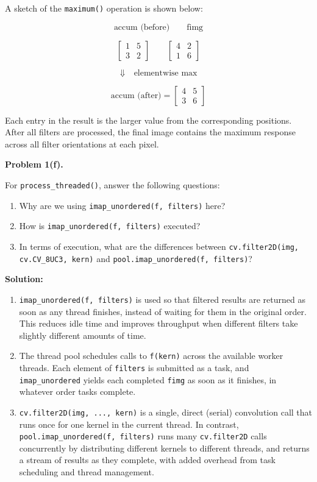 \documentclass[11pt]{article}
\begin{document}
	A sketch of the \texttt{maximum()} operation is shown below:
	
	\[
	\text{accum (before)} \qquad
	\text{fimg}
	\]
	
	\[
	\begin{bmatrix}
		1 & 5 \\
		3 & 2
	\end{bmatrix}
	\qquad
	\begin{bmatrix}
		4 & 2 \\
		1 & 6
	\end{bmatrix}
	\]
	
	\[
	\Downarrow \quad \text{elementwise max}
	\]
	
	\[
	\text{accum (after)} =
	\begin{bmatrix}
		4 & 5 \\
		3 & 6
	\end{bmatrix}
	\]
	
	Each entry in the result is the larger value from the corresponding positions. After all filters are processed, the final image contains the maximum response across all filter orientations at each pixel.
	\newpage
	
	\textbf{Problem 1(f).}
	
	For \texttt{process\_threaded()}, answer the following questions:
	
	\begin{enumerate}
		\item[i.] Why are we using \texttt{imap\_unordered(f, filters)} here?
		\item[ii.] How is \texttt{imap\_unordered(f, filters)} executed?
		\item[iii.] In terms of execution, what are the differences between \texttt{cv.filter2D(img, cv.CV\_8UC3, kern)} and \texttt{pool.imap\_unordered(f, filters)}?
	\end{enumerate}
	
	\textbf{Solution:}
	\begin{enumerate}
		\item[i.] \texttt{imap\_unordered(f, filters)} is used so that filtered results are returned as soon as any thread finishes, instead of waiting for them in the original order. This reduces idle time and improves throughput when different filters take slightly different amounts of time.
		
		\item[ii.] The thread pool schedules calls to \texttt{f(kern)} across the available worker threads. Each element of \texttt{filters} is submitted as a task, and \texttt{imap\_unordered} yields each completed \texttt{fimg} as soon as it finishes, in whatever order tasks complete.
		
		\item[iii.] \texttt{cv.filter2D(img, ..., kern)} is a single, direct (serial) convolution call that runs once for one kernel in the current thread. In contrast, \texttt{pool.imap\_unordered(f, filters)} runs many \texttt{cv.filter2D} calls concurrently by distributing different kernels to different threads, and returns a stream of results as they complete, with added overhead from task scheduling and thread management.
	\end{enumerate}
	
\end{document}
